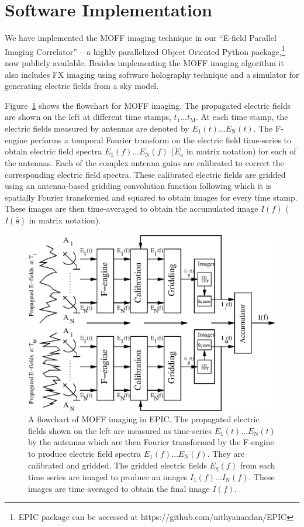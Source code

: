\documentclass[a4paper,fleqn,usenatbib]{../mnras}
\begin{document}
\section{Software Implementation}\label{sec:software}

We have implemented the MOFF imaging technique in our ``E-field Parallel Imaging Correlator'' -- a highly parallelized Object Oriented Python package,\footnote{EPIC package can be accessed at https://github.com/nithyanandan/EPIC} now publicly available. Besides implementing the MOFF imaging algorithm it also includes FX imaging using software holography technique and a simulator for generating electric fields from a sky model. 

Figure~\ref{fig:MOFF-flowchart} shows the flowchart for MOFF imaging. The propagated electric fields are shown on the left at different time stamps, $t_1\ldots t_\textrm{M}$. At each time stamp, the electric fields measured by antennas are denoted by $E_1(t)\ldots E_\textrm{N}(t)$. The F-engine performs a temporal Fourier transform on the electric field time-series to obtain electric field spectra $E_1(f)\ldots E_\textrm{N}(f)$ ($\widetilde{E}_a$ in matrix notation) for each of the antennas. Each of the complex antenna gains are calibrated to correct the corresponding electric field spectra. These calibrated electric fields are gridded using an antenna-based gridding convolution function following which it is spatially Fourier transformed and squared to obtain images for every time stamp. These images are then time-averaged to obtain the accumulated image $I(f)$ ($I(\hat{\mathbf{s}})$ in matrix notation).
\begin{figure}
  \includegraphics[width=\columnwidth]{MOFF_flowchart.eps}
  \caption{A flowchart of MOFF imaging in EPIC. The propagated electric fields shown on the left are measured as time-series $E_1(t)\ldots E_\textrm{N}(t)$ by the antennas which are then Fourier transformed by the F-engine to produce electric field spectra $E_1(f)\ldots E_\textrm{N}(f)$. They are calibrated and gridded. The gridded electric fields $E_\textrm{g}(f)$ from each time series are imaged to produce an images $I_1(f)\ldots I_\textrm{N}(f)$. These images are time-averaged to obtain the final image $I(f)$.}
  \label{fig:MOFF-flowchart}
\end{figure}
\end{document}
